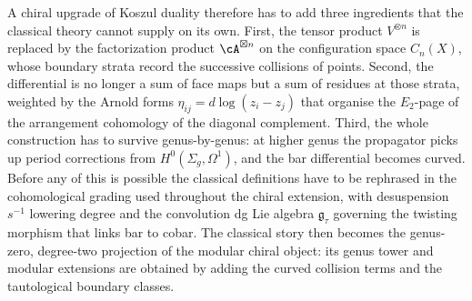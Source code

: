 A chiral upgrade of Koszul duality therefore has to add three
ingredients that the classical theory cannot supply on its own.
First, the tensor product $V^{\otimes n}$ is replaced by the
factorization product $\cA^{\boxtimes n}$ on the configuration
space $C_n(X)$, whose boundary strata record the successive
collisions of points. Second, the differential is no longer a
sum of face maps but a sum of residues at those strata, weighted
by the Arnold forms $\eta_{ij} = d\log(z_i - z_j)$ that organise
the $E_2$-page of the arrangement cohomology of the diagonal
complement. Third, the whole construction has to survive
genus-by-genus: at higher genus the propagator picks up period
corrections from $H^0(\Sigma_g, \Omega^1)$, and the bar
differential becomes curved. Before any of this is possible the
classical definitions have to be rephrased in the cohomological
grading used throughout the chiral extension, with desuspension
$s^{-1}$ lowering degree and the convolution dg Lie algebra
$\mathfrak{g}_\tau$ governing the twisting morphism that links
bar to cobar. The classical story then becomes the genus-zero,
degree-two projection of the modular chiral object: its genus tower
and modular extensions are obtained by adding the curved collision
terms and the tautological boundary classes.

